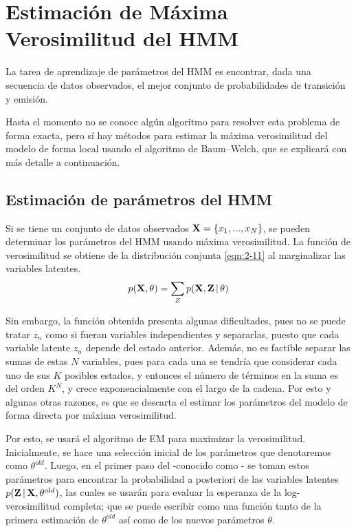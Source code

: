 
\section{Estimación de Máxima Verosimilitud del HMM}

La tarea de aprendizaje de parámetros del \ac{HMM} es encontrar, dada una secuencia de datos observados, el mejor conjunto de probabilidades de transición y emisión.

Hasta el momento no se conoce algún algoritmo para resolver esta problema de forma exacta, pero sí hay métodos para estimar la máxima verosimilitud del modelo de forma local usando el algoritmo de Baum–Welch, que se explicará con más detalle a continuación.

\subsection{Estimación de parámetros del HMM}

Si se tiene un conjunto de datos observados $\textbf{X} = \lbrace x_1, ..., x_N \rbrace$, se pueden determinar los parámetros del \ac{HMM} usando máxima verosimilitud. La función de verosimilitud se obtiene de la distribución conjunta \eqref{eqn:2-11} al marginalizar las variables latentes.
\begin{equation}
  p(\textbf{X}, \theta) = \sum_Z p(\textbf{X}, \textbf{Z} \,|\, \theta)
\label{eqn:3-1}
\end{equation}

Sin embargo, la función obtenida presenta algunas dificultades, pues no se puede tratar $z_n$ como si fueran variables independientes y separarlas, puesto que cada variable latente $z_n$ depende del estado anterior. Además, no es factible separar las sumas de estas $N$ variables, pues para cada una se tendría que considerar cada uno de sus $K$ posibles estados, y entonces el número de términos en la suma es del orden $K^N$, y crece exponencialmente con el largo de la cadena. Por esto y algunas otras razones, es que se descarta el estimar los parámetros del modelo de forma directa por máxima verosimilitud.

Por esto, se usará el algoritmo de \ac{EM} para maximizar la verosimilitud. Inicialmente, se hace una selección inicial de los parámetros que denotaremos como $\theta^{old}$. Luego, en el primer paso del \aem -conocido como \estep- se toman estos parámetros para encontrar la probabilidad a posteriori de las variables latentes $p(\textbf{Z} \,|\, \textbf{X}, \theta^{old})$, las cuales se usarán para evaluar la esperanza de la log-verosimilitud completa; que se puede escribir como una función tanto de la primera estimación de $\theta^{old}$ así como de los nuevos parámetros $\theta$.

